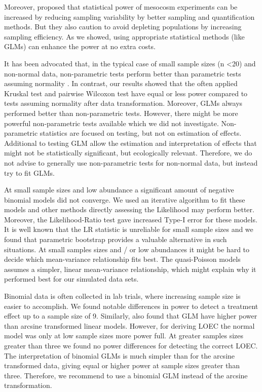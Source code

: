 \documentclass{scrartcl}
\begin{document}
Moreover, \citet{brock_minimum_2015} proposed that statistical power of mesocosm experiments can be increased by reducing sampling variability by better sampling and quantification methods. 
But they also caution to avoid depleting populations by increasing sampling efficiency.
As we showed, using appropriate statistical methods (like GLMs) can enhance the power at no extra costs.

It has been advocated that, in the typical case of small sample sizes (n \textless 20) and non-normal data, non-parametric tests perform better than parametric tests assuming normality \citep{wang_making_2011}.
In contrast, our results showed that the often applied Kruskal test and pairwise Wilcoxon test have equal or less power compared to tests assuming normality after data transformation.
Moreover, GLMs always performed better than non-parametric tests. 
However, there might be more powerful non-parametric tests available \citep{konietschke_rank-based_2012} which we did not investigate.
Non-parametric statistics are focused on testing, but not on estimation of effects.
Additional to testing GLM allow the estimation and interpretation of effects that might not be statistically significant, but ecologically relevant.
Therefore, we do not advise to generally use non-parametric tests for non-normal data, but instead try to fit GLMs.

At small sample sizes and low abundance a significant amount of negative binomial models did not converge.
We used an iterative algorithm to fit these models \citep{venables_modern_2002} and other methods directly assessing the Likelihood may perform better.
Moreover, the Likelihood-Ratio test gave increased Type-I error for these models.
It is well known that the LR statistic is unreliable for small sample sizes \citep{bolker_generalized_2009,wilks_large-sample_1938} and we found that parametric bootstrap provides a valuable alternative in such situations.
At small samples sizes and / or low abundances it might be hard to decide which mean-variance relationship fits best.
The quasi-Poisson models assumes a simpler, linear mean-variance relationship, which might explain why it performed best for our simulated data sets. 


Binomial data is often collected in lab trials, where increasing sample size is easier to accomplish. 
We found notable differences in power to detect a treatment effect up to a sample size of 9.
Similarly, \citet{warton_arcsine_2011} also found that GLM have higher power than arcsine transformed linear models.
However, for deriving LOEC the normal model was only at low sample sizes more power full. At greater samples sizes greater than three we found no power differences for detecting the correct LOEC.
The interpretation of binomial GLMs is much simpler than for the arcsine transformed data, giving equal or higher power at sample sizes greater than three. 
Therefore, we recommend to use a binomial GLM instead of the arcsine transformation.
\end{document}
